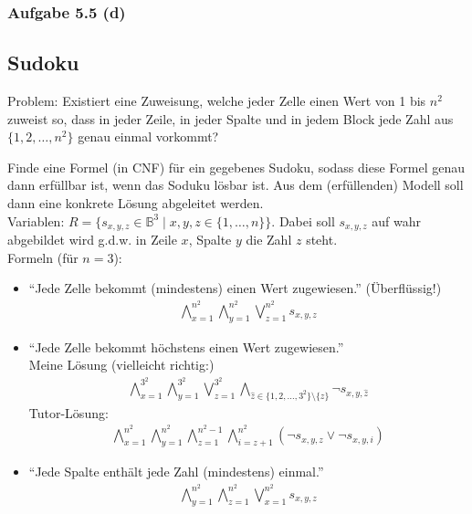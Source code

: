 \subsubsection{Aufgabe 5.5 (d)}

\subsection{Sudoku}
Problem: Existiert eine Zuweisung, welche jeder Zelle einen Wert von 1 bis $n^2$ zuweist so, dass in jeder Zeile, in jeder  Spalte und in jedem Block jede Zahl aus $\lbrace1,2,\ldots,n^2\rbrace$ genau einmal vorkommt?

\begin{aufgabe}
	Finde eine Formel (in CNF) für ein gegebenes Sudoku, sodass diese Formel genau dann erfüllbar ist, wenn das Soduku lösbar ist. 
	Aus dem (erfüllenden) Modell soll dann eine konkrete Lösung abgeleitet werden.\\
	Variablen: $R=\big\lbrace s_{x,y,z}\in\mathbb{B}^3\mid x,y,z\in\lbrace 1,\ldots,n\rbrace\big\rbrace$.
	Dabei soll $s_{x,y,z}$ auf wahr abgebildet wird g.d.w. in Zeile $x$, Spalte $y$ die Zahl $z$ steht.\\
	Formeln (für $n=3$):
	\begin{itemize}
		\item ``Jede Zelle bekommt (mindestens) einen Wert zugewiesen.'' (Überflüssig!)
		\begin{align*}
			\bigwedge\limits_{x=1}^{n^2}\bigwedge\limits_{y=1}^{n^2}\bigvee\limits_{z=1}^{n^2} s_{x,y,z}
		\end{align*}
		\item ``Jede Zelle bekommt höchstens einen Wert zugewiesen.''\\
		Meine Lösung (vielleicht richtig:)
		\begin{align*}
			\bigwedge\limits_{x=1}^{3^2}\bigwedge\limits_{y=1}^{3^2}\bigvee\limits_{z=1}^{3^2}\bigwedge\limits_{\hat{z}\in\lbrace1,2,\ldots,3^2\rbrace\setminus\lbrace z\rbrace} \neg s_{x,y,\hat{z}}
		\end{align*}
		Tutor-Lösung:
		\begin{align*}
			\bigwedge\limits_{x=1}^{n^2}
			\bigwedge\limits_{y=1}^{n^2}
			\bigwedge\limits_{z=1}^{n^2-1}
			\bigwedge\limits_{i=z+1}^{n^2}
			(\neg s_{x,y,z}\vee\neg s_{x,y,i})
		\end{align*}
		\item ``Jede Spalte enthält jede Zahl (mindestens) einmal.''
		\begin{align*}
			\bigwedge\limits_{y=1}^{n^2}\bigwedge\limits_{z=1}^{n^2}\bigvee\limits_{x=1}^{n^2} s_{x,y,z}

\end{align*}
\end{itemize}
\end{aufgabe}
